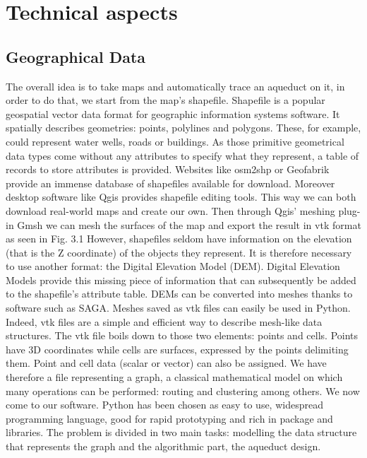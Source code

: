 \chapter{Technical aspects}
\label{capitolo5}
\thispagestyle{empty}


\section {Geographical Data}
\label {Geographical_technical}
The overall idea is to take maps and automatically trace an aqueduct on it, in order to
do that, we start from the map's shapefile. Shapefile is a popular geospatial vector data
format for geographic information systems software. It spatially describes geometries:
points, polylines and polygons. These, for example, could represent water wells, roads or
buildings.
As those primitive geometrical data types come without any attributes to specify what
they represent, a table of records to store attributes is provided. Websites like osm2shp
or Geofabrik provide an immense database of shapefiles available for download. Moreover
desktop software like Qgis provides shapefile editing tools. This way we can both download
real-world maps and create our own.
Then through Qgis' meshing plug-in Gmsh we can mesh the surfaces of the map and export
the result in vtk format as seen in Fig. 3.1 However, shapefiles seldom have information
on the elevation (that is the Z coordinate) of the objects they represent. It is therefore
necessary to use another format: the Digital Elevation Model (DEM). Digital Elevation
Models provide this missing piece of information that can subsequently be added to the
shapefile's attribute table.
DEMs can be converted into meshes thanks to software such as SAGA. Meshes saved as
vtk files can easily be used in Python.
Indeed, vtk files are a simple and efficient way to describe mesh-like data structures. The
vtk file boils down to those two elements: points and cells. Points have 3D coordinates
while cells are surfaces, expressed by the points delimiting them. Point and cell data
(scalar or vector) can also be assigned. We have therefore a file representing a graph, a
classical mathematical model on which many operations can be performed: routing and
clustering among others.
We now come to our software. Python has been chosen as easy to use, widespread programming
language, good for rapid prototyping and rich in package and libraries. The
problem is divided in two main tasks: modelling the data structure that represents the
graph and the algorithmic part, the aqueduct design.

